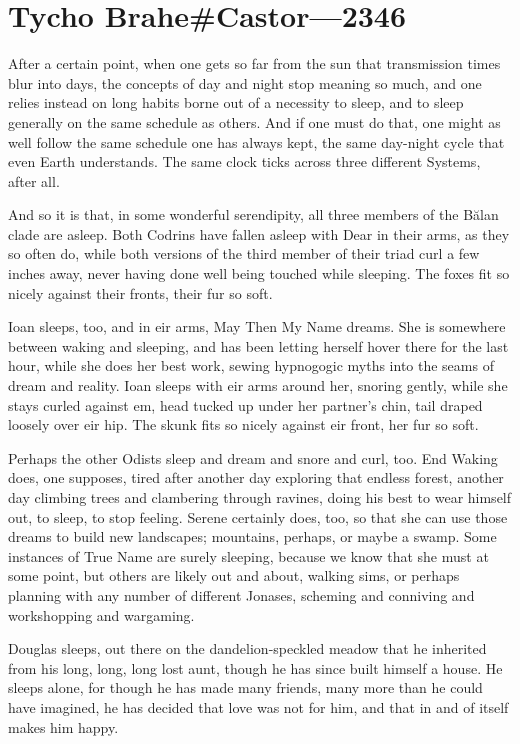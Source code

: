 \hypertarget{tycho-brahecastor-2346}{%
\chapter{Tycho Brahe\#Castor---2346}\label{tycho-brahecastor-2346}}

After a certain point, when one gets so far from the sun that transmission times blur into days, the concepts of day and night stop meaning so much, and one relies instead on long habits borne out of a necessity to sleep, and to sleep generally on the same schedule as others. And if one must do that, one might as well follow the same schedule one has always kept, the same day-night cycle that even Earth understands. The same clock ticks across three different Systems, after all.

And so it is that, in some wonderful serendipity, all three members of the Bălan clade are asleep. Both Codrins have fallen asleep with Dear in their arms, as they so often do, while both versions of the third member of their triad curl a few inches away, never having done well being touched while sleeping. The foxes fit so nicely against their fronts, their fur so soft.

Ioan sleeps, too, and in eir arms, May Then My Name dreams. She is somewhere between waking and sleeping, and has been letting herself hover there for the last hour, while she does her best work, sewing hypnogogic myths into the seams of dream and reality. Ioan sleeps with eir arms around her, snoring gently, while she stays curled against em, head tucked up under her partner's chin, tail draped loosely over eir hip. The skunk fits so nicely against eir front, her fur so soft.

Perhaps the other Odists sleep and dream and snore and curl, too. End Waking does, one supposes, tired after another day exploring that endless forest, another day climbing trees and clambering through ravines, doing his best to wear himself out, to sleep, to stop feeling. Serene certainly does, too, so that she can use those dreams to build new landscapes; mountains, perhaps, or maybe a swamp. Some instances of True Name are surely sleeping, because we know that she must at some point, but others are likely out and about, walking sims, or perhaps planning with any number of different Jonases, scheming and conniving and workshopping and wargaming.

Douglas sleeps, out there on the dandelion-speckled meadow that he inherited from his long, long, long lost aunt, though he has since built himself a house. He sleeps alone, for though he has made many friends, many more than he could have imagined, he has decided that love was not for him, and that in and of itself makes him happy.

